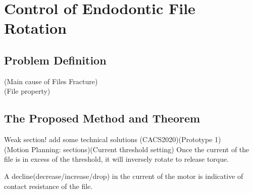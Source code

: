 \chapter{Control of Endodontic File Rotation}
\section{Problem Definition}
(Main cause of Files Fracture)					\\
(File property)
\section{The Proposed Method and Theorem}
Weak section! add some technical solutions
(CACS2020)(Prototype 1)							\\
(Motion Planning: sections)(Current threshold setting)
Once the current of the file is in excess of the threshold, it will inversely rotate to release torque.

A decline(decrease/increase/drop) in the current of the motor is indicative of contact resistance of the file.